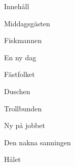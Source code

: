 
\page[right]
\start
\null\blank[3*line]
\centerline{\tfc Innehåll}
\blank[4*line]
\setupwhitespace[line]
\setupnarrower[middle=2cm]
\startnarrower[middle]
\tfa
Middagsgästen\hfill\at[middagsgästen]\par

Fiskmannen\hfill\at[fiskmannen]\par

En ny dag\hfill\at[ennydag]\par

Fästfolket\hfill\at[fastfolket]\par

Duschen\hfill\at[duschen]\par

Trollbunden\hfill\at[trollbunden]\par

Ny på jobbet\hfill\at[nypajobbet]\par

Den nakna sanningen\hfill\at[dennaknasanningen]\par

Hålet\hfill\at[halet]\par

\stopnarrower
\stop

